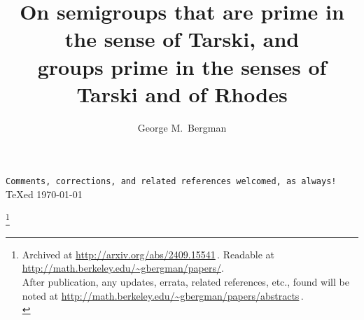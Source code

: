 \documentclass{amsart}
\numberwithin{equation}{section}
\numberwithin{theorem}{section}
\begin{document}
\begin{center}
\texttt{Comments, corrections,
and related references welcomed, as always!}\\[.5em]
{\TeX}ed \today
\\[.5em]
\vspace{2em}
\end{center}

\title%
[Prime semigroups and groups]%
{On semigroups that are prime in the sense of Tarski, and\\
groups prime in the senses of Tarski and of Rhodes}
\thanks{%
Archived at \url{http://arxiv.org/abs/2409.15541}\,.
Readable at \url{http://math.berkeley.edu/~gbergman/papers/}.\\
After publication, any updates, errata, related references,
etc., found will be noted at
\url{http://math.berkeley.edu/~gbergman/papers/abstracts}\,.\\
}


\author{George M.\ Bergman}
\address{Department of Mathematics\\
University of California\\
Berkeley, CA 94720-3840, USA}
\end{document}
